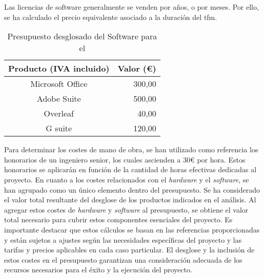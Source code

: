 Las licencias de software generalmente se venden por años, o por meses. Por ello, se ha calculado el precio equivalente asociado a la duración del \gls{tfm}.
\begin{table}[ht]
	\centering
	\begin{tabular}{|c|r|}
		\hline
		\rowcolor[HTML]{EFEFEF}
		\textbf{Producto (IVA incluido)} & \multicolumn{1}{c|}{\cellcolor[HTML]{EFEFEF}\textbf{Valor (€)}} \\ \hline
		Microsoft Office                 & 300,00                                                          \\ \hline
		Adobe Suite                      & 500,00                                                          \\ \hline
		Overleaf                         & 40,00                                                           \\ \hline
		G suite                          & 120,00                                                          \\ \hline
	\end{tabular}
	\caption{Presupuesto desglosado del Software  para el }
	\label{tab:costesSoftware}
\end{table}

\vspace{0.5cm}

Para determinar los costes de mano de obra, se han utilizado como referencia los honorarios de un ingeniero senior, los cuales ascienden a 30€ por hora. Estos honorarios se aplicarán en función de la cantidad de horas efectivas dedicadas al proyecto. En cuanto a los costes relacionados con el \textit{hardware} y el \textit{software}, se han agrupado como un único elemento dentro del presupuesto. Se ha considerado el valor total resultante del desglose de los productos indicados en el análisis. Al agregar estos costes de \textit{hardware} y \textit{software} al presupuesto, se obtiene el valor total necesario para cubrir estos componentes esenciales del proyecto. Es importante destacar que estos cálculos se basan en las referencias proporcionadas y están sujetos a ajustes según las necesidades específicas del proyecto y las tarifas y precios aplicables en cada caso particular. El desglose y la inclusión de estos costes en el presupuesto garantizan una consideración adecuada de los recursos necesarios para el éxito y la ejecución del proyecto.
\vspace{0.5cm}

